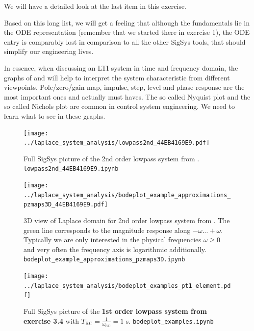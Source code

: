We will have a detailed look at the last item in this exercise.

Based on this long list, we will get a feeling that although the fundamentals
lie in the ODE representation (remember that we started there in exercise 1),
the ODE entry is comparably lost in comparison to all the other SigSys tools,
that should simplify our engineering lives.

\begin{mdframed}
In essence, when discussing an LTI system in time and frequency domain, the
graphs of  and 
will help to interpret the system characteristic from different viewpoints.
Pole/zero/gain map, impulse, step, level and phase response are the most important
ones and actually must haves.
The so called Nyquist plot and the so called Nichols plot are common in
control system engineering.
We need to learn what to see in these graphs.
\end{mdframed}




\begin{figure}
  \texttt{[image: ../laplace\_system\_analysis/lowpass2nd\_44EB4169E9.pdf]}
  \caption{Full SigSys picture of the 2nd order lowpass system from
  . \texttt{lowpass2nd\_44EB4169E9.ipynb}}
  \label{fig:lowpass2nd_44EB4169E9}
\end{figure}


\begin{figure}
  \texttt{[image: ../laplace\_system\_analysis/bodeplot\_example\_approximations\_pzmaps3D\_44EB4169E9.pdf]}
  \caption{3D view of Laplace domain for 2nd order lowpass system from
  .
  The green line corresponds to the magnitude response along $-\omega...+\omega$.
  Typically we are only interested in the physical frequencies $\omega\geq0$ and
  very often the frequency axis is logarithmic additionally.
  \texttt{bodeplot\_example\_approximations\_pzmaps3D.ipynb}}
  \label{fig:bodeplot_example_approximations_pzmaps3D_44EB4169E9}
\end{figure}




\begin{figure}
  \texttt{[image: ../laplace\_system\_analysis/bodeplot\_examples\_pt1\_element.pdf]}
  \caption{Full SigSys picture of the \textbf{1st order lowpass system from
  exercise 3.4} with $T_\mathrm{RC} = \frac{1}{\omega_\mathrm{RC}} = 1$ s.
  \texttt{bodeplot\_examples.ipynb}}
  \label{fig:bodeplot_examples_pt1_element}
\end{figure}



